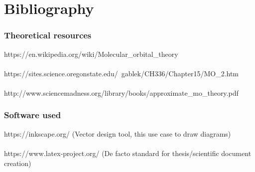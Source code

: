 \chapter{Bibliography}
        \normalsize\subsection{Theoretical resources}
        \small
        https://en.wikipedia.org/wiki/Molecular\_orbital\_theory
        \\
        \\
        https://sites.science.oregonstate.edu/~gablek/CH336/Chapter15/MO\_2.htm
        \\
        \\
        http://www.sciencemadness.org/library/books/approximate\_mo\_theory.pdf

        \normalsize\subsection{Software used}
        \small
        https://inkscape.org/ (Vector design tool, this use case to draw diagrams)
        \\
        \\
        https://www.latex-project.org/ (De facto standard for thesis/scientific document creation)
